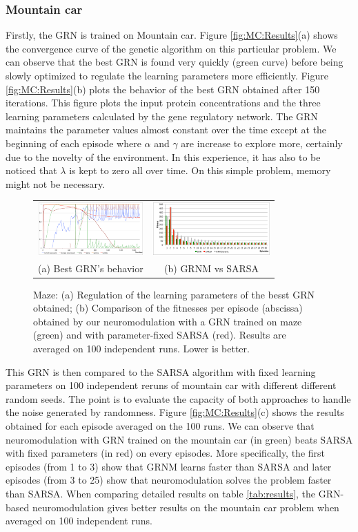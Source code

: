 \subsubsection{Mountain car}
Firstly, the GRN is trained on Mountain car. Figure \ref{fig:MC:Results}(a) shows the convergence curve of the genetic algorithm on this particular problem. We can observe that the best GRN is found very quickly (green curve) before being slowly optimized to regulate the learning parameters more efficiently. Figure \ref{fig:MC:Results}(b) plots the behavior of the best GRN obtained after 150 iterations. This figure plots the input protein concentrations and the three learning parameters calculated by the gene regulatory network. The GRN maintains the parameter values almost constant over the time except at the beginning of each episode where $\alpha$ and $\gamma$ are increase to explore more, certainly due to the novelty of the environment. In this experience, it has also to be noticed that $\lambda$ is kept to zero all over time. On this simple problem, memory might not be necessary. 

\begin{figure}[b!]
\setlength{\tabcolsep}{0.5mm}
\begin{tabular}{cc}
\includegraphics[height=2cm]{MZ_GRNBehavior.pdf}&
\includegraphics[height=2cm]{MZ_GRNvsSARSA.pdf}\\
(a) Best GRN's behavior &
(b) GRNM vs SARSA
\end{tabular}
\caption{Maze: (a) Regulation of the learning parameters of the besst GRN obtained; (b) Comparison of the fitnesses per episode (abscissa) obtained by our neuromodulation with a GRN trained on maze (green) and with parameter-fixed SARSA (red). Results are averaged on 100 independent runs. Lower is better.}\label{fig:MZ:Results}
\end{figure}

This GRN is then compared to the SARSA algorithm with fixed learning parameters on 100 independent reruns of mountain car with different different random seeds. The point is to evaluate the capacity of both approaches to handle the noise generated by randomness. Figure \ref{fig:MC:Results}(c) shows the results obtained for each episode averaged on the 100 runs. We can observe that neuromodulation with GRN trained on the mountain car (in green) beats SARSA with fixed parameters (in red) on every episodes. More specifically, the first episodes (from 1 to 3) show that GRNM learns faster than SARSA and later episodes (from 3 to 25) show that neuromodulation solves the problem faster than SARSA. When comparing detailed results on table \ref{tab:results}, the GRN-based neuromodulation gives better results on the mountain car problem when averaged on 100 independent runs. 

